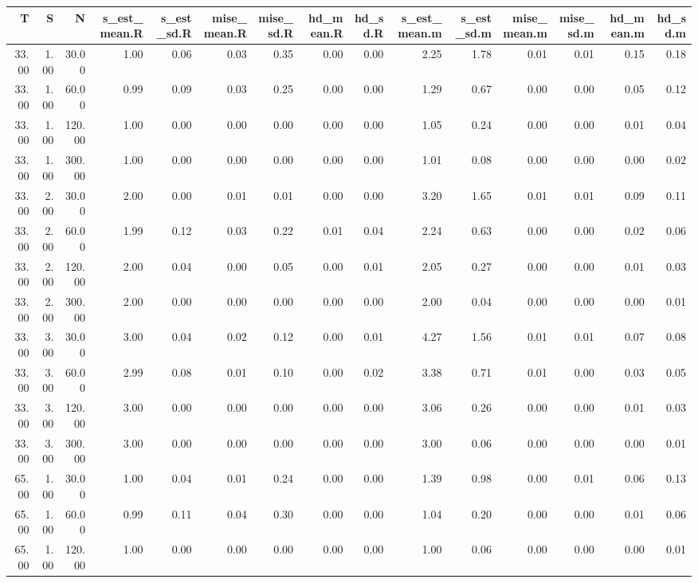 \begin{table}[ht]
\centering
\begin{tabular}{rrrrrrrrrrrrrrr}
  \hline
T & S & N & s\_est\_mean.R & s\_est\_sd.R & mise\_mean.R & mise\_sd.R & hd\_mean.R & hd\_sd.R & s\_est\_mean.m & s\_est\_sd.m & mise\_mean.m & mise\_sd.m & hd\_mean.m & hd\_sd.m \\ 
  \hline
33.00 & 1.00 & 30.00 & 1.00 & 0.06 & 0.03 & 0.35 & 0.00 & 0.00 & 2.25 & 1.78 & 0.01 & 0.01 & 0.15 & 0.18 \\ 
  33.00 & 1.00 & 60.00 & 0.99 & 0.09 & 0.03 & 0.25 & 0.00 & 0.00 & 1.29 & 0.67 & 0.00 & 0.00 & 0.05 & 0.12 \\ 
  33.00 & 1.00 & 120.00 & 1.00 & 0.00 & 0.00 & 0.00 & 0.00 & 0.00 & 1.05 & 0.24 & 0.00 & 0.00 & 0.01 & 0.04 \\ 
  33.00 & 1.00 & 300.00 & 1.00 & 0.00 & 0.00 & 0.00 & 0.00 & 0.00 & 1.01 & 0.08 & 0.00 & 0.00 & 0.00 & 0.02 \\ 
  33.00 & 2.00 & 30.00 & 2.00 & 0.00 & 0.01 & 0.01 & 0.00 & 0.00 & 3.20 & 1.65 & 0.01 & 0.01 & 0.09 & 0.11 \\ 
  33.00 & 2.00 & 60.00 & 1.99 & 0.12 & 0.03 & 0.22 & 0.01 & 0.04 & 2.24 & 0.63 & 0.00 & 0.00 & 0.02 & 0.06 \\ 
  33.00 & 2.00 & 120.00 & 2.00 & 0.04 & 0.00 & 0.05 & 0.00 & 0.01 & 2.05 & 0.27 & 0.00 & 0.00 & 0.01 & 0.03 \\ 
  33.00 & 2.00 & 300.00 & 2.00 & 0.00 & 0.00 & 0.00 & 0.00 & 0.00 & 2.00 & 0.04 & 0.00 & 0.00 & 0.00 & 0.01 \\ 
  33.00 & 3.00 & 30.00 & 3.00 & 0.04 & 0.02 & 0.12 & 0.00 & 0.01 & 4.27 & 1.56 & 0.01 & 0.01 & 0.07 & 0.08 \\ 
  33.00 & 3.00 & 60.00 & 2.99 & 0.08 & 0.01 & 0.10 & 0.00 & 0.02 & 3.38 & 0.71 & 0.01 & 0.00 & 0.03 & 0.05 \\ 
  33.00 & 3.00 & 120.00 & 3.00 & 0.00 & 0.00 & 0.00 & 0.00 & 0.00 & 3.06 & 0.26 & 0.00 & 0.00 & 0.01 & 0.03 \\ 
  33.00 & 3.00 & 300.00 & 3.00 & 0.00 & 0.00 & 0.00 & 0.00 & 0.00 & 3.00 & 0.06 & 0.00 & 0.00 & 0.00 & 0.01 \\ 
  65.00 & 1.00 & 30.00 & 1.00 & 0.04 & 0.01 & 0.24 & 0.00 & 0.00 & 1.39 & 0.98 & 0.00 & 0.01 & 0.06 & 0.13 \\ 
  65.00 & 1.00 & 60.00 & 0.99 & 0.11 & 0.04 & 0.30 & 0.00 & 0.00 & 1.04 & 0.20 & 0.00 & 0.00 & 0.01 & 0.06 \\ 
  65.00 & 1.00 & 120.00 & 1.00 & 0.00 & 0.00 & 0.00 & 0.00 & 0.00 & 1.00 & 0.06 & 0.00 & 0.00 & 0.00 & 0.01 \\ 

\end{tabular}
\end{table}
